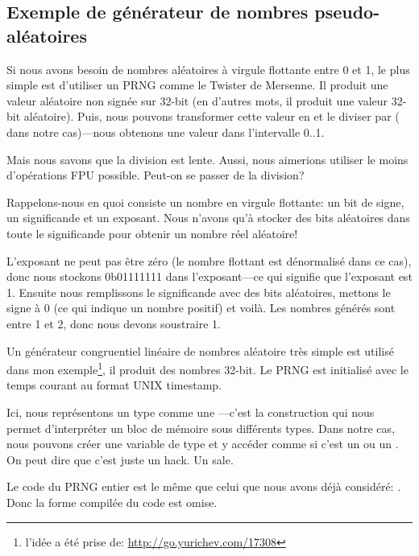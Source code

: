 \subsection{Exemple de générateur de nombres pseudo-aléatoires}
\label{FPU_PRNG}

Si nous avons besoin de nombres aléatoires à virgule flottante entre 0 et 1, le plus
simple est d'utiliser un \ac{PRNG} comme le Twister de Mersenne.
Il produit une valeur aléatoire non signée sur 32-bit (en d'autres mots, il produit
une valeur 32-bit aléatoire).
Puis, nous pouvons transformer cette valeur en \Tfloat et le diviser par 
( dans notre cas)---nous obtenons une valeur dans l'intervalle 0..1.

Mais nous savons que la division est lente.
Aussi, nous aimerions utiliser le moins d'opérations FPU possible.
Peut-on se passer de la division?


Rappelons-nous en quoi consiste un nombre en virgule flottante: un bit de signe,
un significande et un exposant.
Nous n'avons qu'à stocker des bits aléatoires dans toute le significande pour obtenir
un nombre réel aléatoire!

L'exposant ne peut pas être zéro (le nombre flottant est dénormalisé dans ce cas),
donc nous stockons 0b01111111 dans l'exposant---ce qui signifie que l'exposant est
1.
Ensuite nous remplissons le significande avec des bits aléatoires, mettons le signe à
0 (ce qui indique un nombre positif) et voilà.
Les nombres générés sont entre 1 et 2, donc nous devons soustraire 1.

\newcommand{\URLXOR}{\url{http://go.yurichev.com/17308}}

Un générateur congruentiel linéaire de nombres aléatoire très simple est utilisé dans
mon exemple\footnote{l'idée a été prise de: \URLXOR}, il produit des nombres 32-bit.
Le \ac{PRNG} est initialisé avec le temps courant au format UNIX timestamp.

Ici, nous représentons un type \Tfloat comme une ---c'est la construction \CCpp qui nous
permet d'interpréter un bloc de mémoire sous différents types.
Dans notre cas, nous pouvons créer une variable de type  et y accéder comme
si c'est un \Tfloat ou un .
On peut dire que c'est juste un hack. Un sale.


Le code du \ac{PRNG} entier est le même que celui que nous avons déjà considéré: .
Donc la forme compilée du code est omise.

